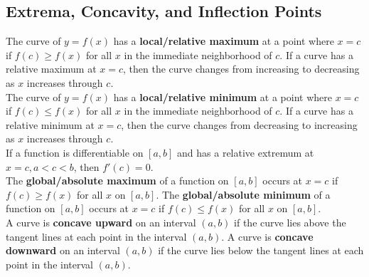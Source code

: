 \documentclass{article}
\begin{document}
        \subsection{Extrema, Concavity, and Inflection Points}
            The curve of $y=f(x)$ has a \textbf{local/relative maximum} at a point where $x=c$ if
            $f(c)\geq f(x)$ for all $x$ in the immediate neighborhood of $c$. If a curve has a
            relative maximum at $x=c$, then the curve changes from increasing to decreasing as $x$
            increases through $c$. \\

            \noindent The curve of $y=f(x)$ has a \textbf{local/relative minimum} at a point where
            $x=c$ if $f(c)\leq f(x)$ for all $x$ in the immediate neighborhood of $c$.
            If a curve has a relative minimum at $x=c$, then the curve changes from decreasing to
            increasing as $x$ increases through $c$. \\

            \noindent If a function is differentiable on $[a,b]$ and has a relative extremum at $
            x=c, a<c<b$, then $f'(c)=0$. \\

            \noindent The \textbf{global/absolute maximum} of a function on $[a,b]$ occurs at $x=c$
            if $f(c)\geq f(x)$ for all $x$ on $[a,b]$. The \textbf{global/absolute minimum} of a
            function on $[a,b]$ occurs at $x=c$ if $f(c)\leq f(x)$ for all $x$ on $[a,b]$. \\

            \noindent A curve is \textbf{concave upward} on an interval $(a,b)$ if the curve lies
            above the tangent lines at each point in the interval $(a,b)$. A curve is
            \textbf{concave downward} on an interval $(a,b)$ if the curve lies below the tangent
            lines at each point in the interval $(a,b)$. \\
\end{document}
